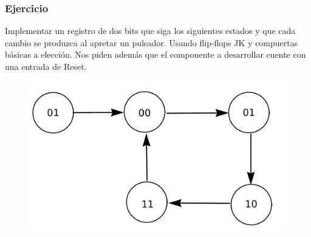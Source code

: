 \documentclass[10pt]{beamer}
\begin{document}
\begin{frame}
\frametitle{Ejercicio}

Implementar un registro de dos bits que siga los siguientes estados
y que cada cambio se produzca al apretar un pulsador. Usando
flip-flops JK y compuertas b\'asicas a elecci\'on.
Nos piden adem\'as que el componente a desarrollar cuente con una
entrada de Reset.

\begin{figure}[h!]
    \centering
    \includegraphics[scale=0.21]{ej1.png}
\end{figure}
\end{frame}
\end{document}
